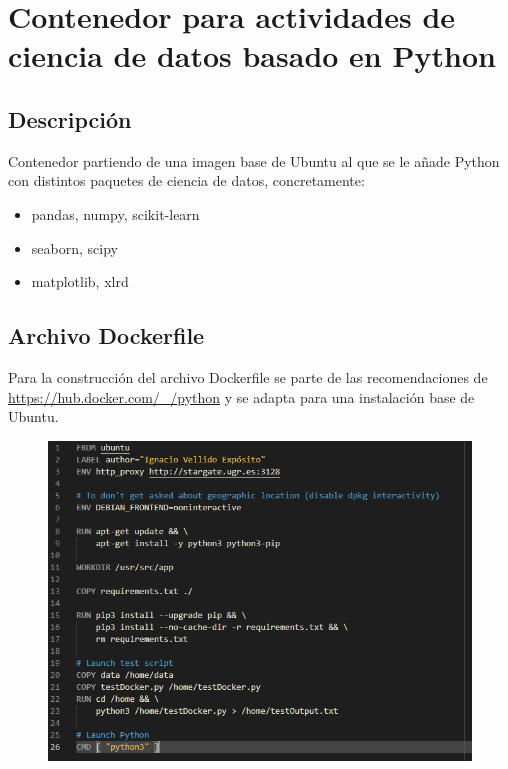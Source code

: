 \section{Contenedor para actividades de ciencia de datos basado en Python}

\subsection{Descripción}

Contenedor partiendo de una imagen base de Ubuntu al que se le añade Python con distintos paquetes de ciencia de datos, concretamente:
\begin{itemize}
    \item pandas, numpy, scikit-learn
    \item seaborn, scipy
    \item matplotlib, xlrd
\end{itemize}

\subsection{Archivo Dockerfile}

Para la construcción del archivo Dockerfile se parte de las recomendaciones de \url{https://hub.docker.com/_/python} y se adapta para una instalación base de Ubuntu.

\begin{figure}[H]\center\includegraphics[width=.82\linewidth]{img/python/p0.png}\caption{}\end{figure}

